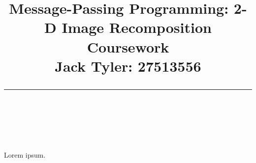 \documentclass{article} %
\title{\raggedright
\normalfont \normalsize 
\huge Message-Passing Programming: 2-D Image Recomposition Coursework \\[1em]
\normalsize \normalfont Jack Tyler: 27513556 \\
\rule{\linewidth}{.5pt}  \\[6pt]
}
\begin{document}
\maketitle

Lorem ipsum.
\end{document}
